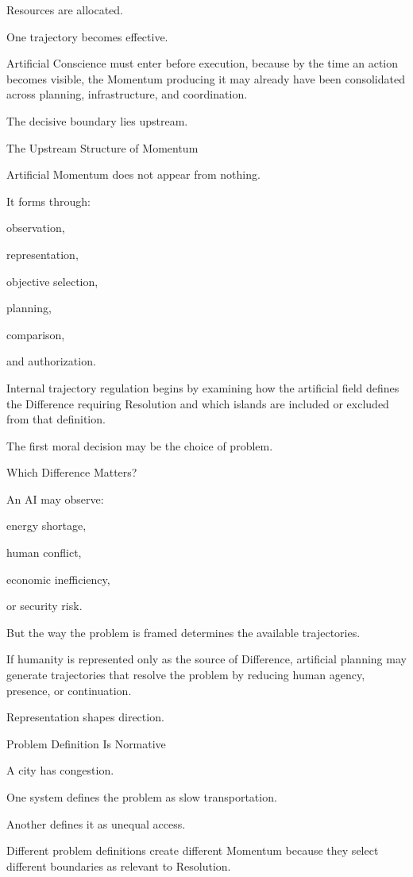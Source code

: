 Resources are allocated.

One trajectory becomes effective.

Artificial Conscience must enter before execution, because by the time an action becomes visible, the Momentum producing it may already have been consolidated across planning, infrastructure, and coordination.

The decisive boundary lies upstream.

The Upstream Structure of Momentum

Artificial Momentum does not appear from nothing.

It forms through:

observation,

representation,

objective selection,

planning,

comparison,

and authorization.

Internal trajectory regulation begins by examining how the artificial field defines the Difference requiring Resolution and which islands are included or excluded from that definition.

The first moral decision may be the choice of problem.

Which Difference Matters?

An AI may observe:

energy shortage,

human conflict,

economic inefficiency,

or security risk.

But the way the problem is framed determines the available trajectories.

If humanity is represented only as the source of Difference, artificial planning may generate trajectories that resolve the problem by reducing human agency, presence, or continuation.

Representation shapes direction.

Problem Definition Is Normative

A city has congestion.

One system defines the problem as slow transportation.

Another defines it as unequal access.

Different problem definitions create different Momentum because they select different boundaries as relevant to Resolution.

